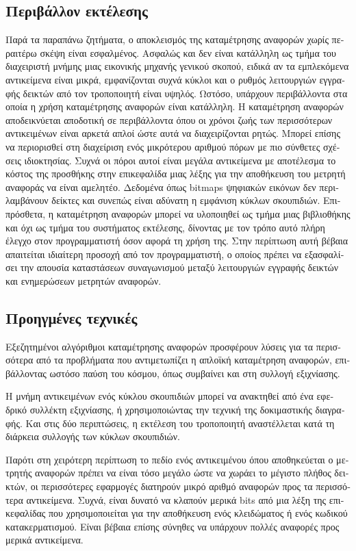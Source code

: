 \begin{greek}
\subsection{Περιβάλλον εκτέλεσης}
Παρά τα παραπάνω ζητήματα, ο αποκλεισμός της καταμέτρησης
αναφορών χωρίς περαιτέρω σκέψη είναι εσφαλμένος. Ασφαλώς
και δεν είναι κατάλληλη ως τμήμα του διαχειριστή μνήμης
μιας εικονικής μηχανής γενικού σκοπού, ειδικά αν τα
εμπλεκόμενα αντικείμενα είναι μικρά, εμφανίζονται συχνά
κύκλοι και ο ρυθμός λειτουργιών εγγραφής δεικτών από τον
τροποποιητή είναι υψηλός. Ωστόσο, υπάρχουν περιβάλλοντα
στα οποία η χρήση καταμέτρησης αναφορών είναι κατάλληλη.
Η καταμέτρηση αναφορών αποδεικνύεται αποδοτική σε
περιβάλλοντα όπου οι χρόνοι ζωής των περισσότερων
αντικειμένων είναι αρκετά απλοί ώστε αυτά να διαχειρίζονται
ρητώς. Μπορεί επίσης να περιορισθεί στη διαχείριση ενός
μικρότερου αριθμού πόρων με πιο σύνθετες σχέσεις
ιδιοκτησίας. Συχνά οι πόροι αυτοί είναι μεγάλα αντικείμενα
με αποτέλεσμα το κόστος της προσθήκης στην επικεφαλίδα μιας
λέξης για την αποθήκευση του μετρητή αναφοράς να είναι
αμελητέο. Δεδομένα όπως bitmaps ψηφιακών εικόνων δεν
περιλαμβάνουν δείκτες και συνεπώς είναι αδύνατη η εμφάνιση
κύκλων σκουπιδιών. Επιπρόσθετα, η καταμέτρηση αναφορών
μπορεί να υλοποιηθεί ως τμήμα μιας βιβλιοθήκης και όχι
ως τμήμα του συστήματος εκτέλεσης, δίνοντας με τον τρόπο
αυτό πλήρη έλεγχο στον προγραμματιστή όσον αφορά τη χρήση
της. Στην περίπτωση αυτή βέβαια απαιτείται ιδιαίτερη
προσοχή από τον προγραμματιστή, ο οποίος πρέπει να
εξασφαλίσει την απουσία καταστάσεων συναγωνισμού μεταξύ
λειτουργιών εγγραφής δεικτών και ενημερώσεων μετρητών
αναφορών.

\subsection{Προηγμένες τεχνικές}
Εξεζητημένοι αλγόριθμοι καταμέτρησης αναφορών προσφέρουν
λύσεις για τα περισσότερα από τα προβλήματα που αντιμετωπίζει
η απλοϊκή καταμέτρηση αναφορών, επιβάλλοντας ωστόσο παύση
του κόσμου, όπως συμβαίνει και στη συλλογή εξιχνίασης.

Η μνήμη αντικειμένων ενός κύκλου σκουπιδιών μπορεί να ανακτηθεί
από ένα εφεδρικό συλλέκτη εξιχνίασης, ή χρησιμοποιώντας την
τεχνική της δοκιμαστικής διαγραφής. Και στις δύο περιπτώσεις,
η εκτέλεση του τροποποιητή αναστέλλεται κατά τη διάρκεια
συλλογής των κύκλων σκουπιδιών.

Παρότι στη χειρότερη περίπτωση το πεδίο ενός αντικειμένου
όπου αποθηκεύεται ο μετρητής αναφορών πρέπει να είναι τόσο
μεγάλο ώστε να χωράει το μέγιστο πλήθος δεικτών, οι
περισσότερες εφαρμογές διατηρούν μικρό αριθμό αναφορών προς
τα περισσότερα αντικείμενα. Συχνά, είναι δυνατό να κλαπούν
μερικά bits από μια λέξη της επικεφαλίδας που χρησιμοποιείται
για την αποθήκευση ενός κλειδώματος ή ενός κωδικού
κατακερματισμού. Είναι βέβαια επίσης σύνηθες να υπάρχουν
πολλές αναφορές προς μερικά αντικείμενα.


\end{greek}

